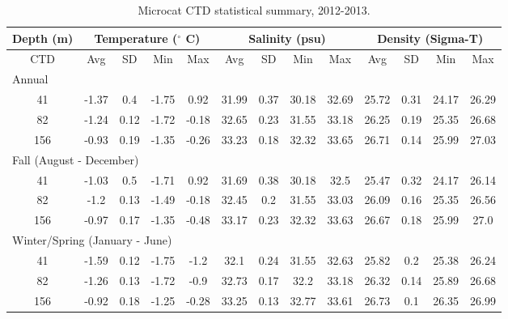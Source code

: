 \documentclass[12pt]{dforeport}
\begin{document}
\begin{landscape}
\begin{table}[ht] 
\centering
\caption[Microcat CTD statistical summary, 2012-2013]{Microcat CTD statistical summary, 2012-2013.} 
\label{t:ss_2012_2013}
\begin{tabular}{c | c c c c | c c c c | c c c c}
\toprule 
\multicolumn{1}{c}{\textbf{Depth (m)}} & \multicolumn{4}{c}{\textbf{Temperature ($^\circ$ C)}} & \multicolumn{4}{c}{\textbf{Salinity (psu)}} & \multicolumn{4}{c}{\textbf{Density (Sigma-T)}} \\\hline
\midrule
CTD & Avg & SD & Min & Max & Avg & SD & Min & Max & Avg & SD & Min & Max \\  
\midrule 
\multicolumn{13}{l}{Annual} \\
\midrule
41 & -1.37 & 0.4 & -1.75 & 0.92 & 31.99 & 0.37 & 30.18 & 32.69 & 25.72 & 0.31 & 24.17 & 26.29 \\
82 & -1.24 & 0.12 & -1.72 & -0.18 & 32.65 & 0.23 & 31.55 & 33.18 & 26.25 & 0.19 & 25.35 & 26.68 \\
156 & -0.93 & 0.19 & -1.35 & -0.26 & 33.23 & 0.18 & 32.32 & 33.65 & 26.71 & 0.14 & 25.99 & 27.03 \\
\midrule 
\multicolumn{13}{l}{Fall (August - December)} \\
\midrule
41 & -1.03 & 0.5 & -1.71 & 0.92 & 31.69 & 0.38 & 30.18 & 32.5 & 25.47 & 0.32 & 24.17 & 26.14 \\
82 & -1.2 & 0.13 & -1.49 & -0.18 & 32.45 & 0.2 & 31.55 & 33.03 & 26.09 & 0.16 & 25.35 & 26.56 \\
156 & -0.97 & 0.17 & -1.35 & -0.48 & 33.17 & 0.23 & 32.32 & 33.63 & 26.67 & 0.18 & 25.99 & 27.0 \\
\midrule  
\multicolumn{13}{l}{Winter/Spring (January - June)} \\
\midrule
41 & -1.59 & 0.12 & -1.75 & -1.2 & 32.1 & 0.24 & 31.55 & 32.63 & 25.82 & 0.2 & 25.38 & 26.24 \\
82 & -1.26 & 0.13 & -1.72 & -0.9 & 32.73 & 0.17 & 32.2 & 33.18 & 26.32 & 0.14 & 25.89 & 26.68 \\
156  & -0.92 & 0.18 & -1.25 & -0.28 & 33.25 & 0.13 & 32.77 & 33.61 & 26.73 & 0.1 & 26.35 & 26.99 \\
\bottomrule
\end{tabular}
\end{table}



\end{landscape}
\end{document}
